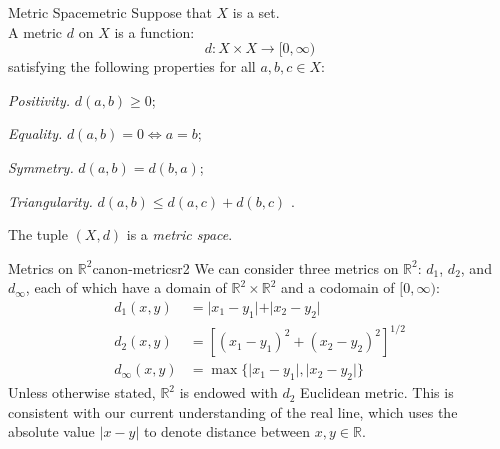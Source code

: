 \documentclass{article}
\numberwithin{equation}{section}
\numberwithin{figure}{section}
\newcommand*\setaxiomprefix[1]{
    \setlist[axioms]{label=#1\arabic*), ref=#1\arabic*}
}
\begin{document}
\begin{definition}{Metric Space}{metric}
    Suppose that $ X $ is a set.\\
    A metric $ d $ on $ X $ is a function:
    \begin{equation}
        d: X \times X \rightarrow [0,\infty) 
    \end{equation} satisfying the following properties for all $ a, b, c \in X $:
    \setaxiomprefix{M}
    \begin{axioms}
        \item \emph{Positivity.} $ d(a, b) \geq 0 $;
        \item \emph{Equality.} $ d(a, b) = 0 \iff a = b $;
        \item \emph{Symmetry.} $ d(a, b) = d(b, a) $;
        \item \emph{Triangularity.} $ d(a, b) \leq d(a, c) + d(b, c) $
            \label{axiom:triangle-inequality}.
    \end{axioms}
    The tuple $ (X, d) $ is a \emph{metric space}.
\end{definition}
\begin{definition}{Metrics on \texorpdfstring{$\mathbb{R}^2$}{a
        2-dimensional real vector space}}{canon-metricsr2}
    We can consider three metrics on $ \mathbb{R}^2 $: $ d_1 $, $ d_2 $, and
    $ d_\infty $, each of which have a domain of $ \mathbb{R}^2 \times
    \mathbb{R}^2 $ and a codomain of $ [0, \infty) $:
    \begin{align}
        d_1(x,y) &= \vert x_1 - y_1 
            \vert + \vert x_2- y_2 
            \vert\label{eqn:d1-metricr2} \\
        d_2(x,y) &= \left[(x_1 - y_1)^2+(x_2 - y_2)^2
            \right]^{1/2} \label{eqn:d2-metricr2} \\[.4em]
        d_\infty(x,y) &= \max \{ \vert x_1 -
            y_1 \vert, \vert x_2 -
            y_2 \vert \}\label{eqn:dinf-metricr2}
    \end{align}
    Unless otherwise stated, $ \mathbb{R}^2 $ is endowed with $ d_2 $ Euclidean
    metric. This is consistent with our current understanding of the real line,
    which uses the absolute value $ \vert x - y \vert $ to denote distance
    between $ x, y \in \mathbb{R} $.
\end{definition}
\end{document}
